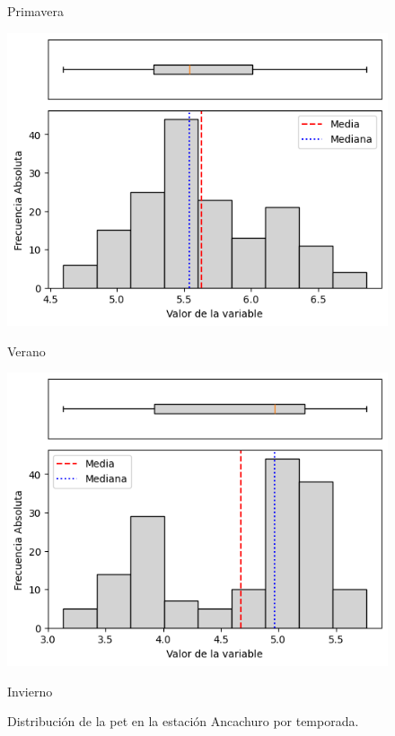\begin{figure}[htbp]
\begin{minipage}{0.30\textwidth}
    \caption*{Primavera}
\end{minipage}
\vspace{0.3cm}
\begin{minipage}{0.30\textwidth}
    \centering
    \includegraphics[width=\linewidth]{resultados/por_estacion_del_anio/Ancachuro/PET_HistBoxplot_Summer.png}
    \caption*{Verano}
\end{minipage}
\hfill
\begin{minipage}{0.30\textwidth}
    \centering
    \includegraphics[width=\linewidth]{resultados/por_estacion_del_anio/Ancachuro/PET_HistBoxplot_Winter.png}
    \caption*{Invierno}
\end{minipage}
\caption{Distribución de la \gls{pet}  en la estación Ancachuro por temporada.}
\label{fig:pet_hist_ancachuro}
\end{figure}

